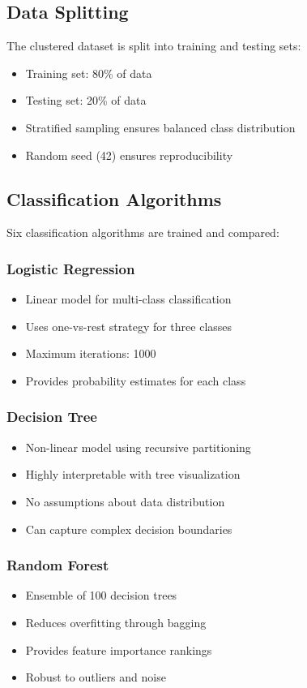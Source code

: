 \documentclass[12pt,a4paper]{report}
\begin{document}
\subsection{Data Splitting}
\noindent The clustered dataset is split into training and testing sets:
\begin{itemize}
    \item Training set: 80\% of data
    \item Testing set: 20\% of data
    \item Stratified sampling ensures balanced class distribution
    \item Random seed (42) ensures reproducibility
\end{itemize}

\subsection{Classification Algorithms}
\noindent Six classification algorithms are trained and compared:

\subsubsection{Logistic Regression}
\begin{itemize}
    \item Linear model for multi-class classification
    \item Uses one-vs-rest strategy for three classes
    \item Maximum iterations: 1000
    \item Provides probability estimates for each class
\end{itemize}

\subsubsection{Decision Tree}
\begin{itemize}
    \item Non-linear model using recursive partitioning
    \item Highly interpretable with tree visualization
    \item No assumptions about data distribution
    \item Can capture complex decision boundaries
\end{itemize}

\subsubsection{Random Forest}
\begin{itemize}
    \item Ensemble of 100 decision trees
    \item Reduces overfitting through bagging
    \item Provides feature importance rankings
    \item Robust to outliers and noise
\end{itemize}
\end{document}
